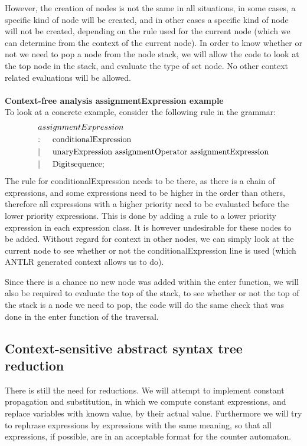 \documentclass[12pt]{article}
\begin{document}
However, the creation of nodes is not the same in all situations, in some cases, a specific kind of node will be created, and in other cases a specific kind of node will not be created, depending on the rule used for the current node (which we can determine from the context of the current node). In order to know whether or not we need to pop a node from the node stack, we will allow the code to look at the top node in the stack, and evaluate the type of set node. No other context related evaluations will be allowed.\\
\\
\noindent
\textbf{Context-free analysis assignmentExpression example}\\
To look at a concrete example, consider the following rule in the grammar:
\begin{align*}
	&assignmentExpression\\
	&\text{:}\indent \text{conditionalExpression}\\
	&|\indent \text{unaryExpression assignmentOperator assignmentExpression}\\
	&|\indent \text{Digitsequence}; \\
\end{align*}
The rule for conditionalExpression needs to be there, as there is a chain of expressions, and some expressions need to be higher in the order than others, therefore all expressions with a higher priority need to be evaluated before the lower priority expressions. This is done by adding a rule to a lower priority expression in each expression class. It is however undesirable for these nodes to be added. Without regard for context in other nodes, we can simply look at the current node to see whether or not the conditionalExpression line is used (which ANTLR generated context allows us to do).

Since there is a chance no new node was added within the enter function, we will also be required to evaluate the top of the stack, to see whether or not the top of the stack is a node we need to pop, the code will do the same check that was done in the enter function of the traversal.

\subsection{Context-sensitive abstract syntax tree reduction}
There is still the need for reductions. We will attempt to implement constant propagation and substitution, in which we compute constant expressions, and replace variables with known value, by their actual value. Furthermore we will try to rephrase expressions by expressions with the same meaning, so that all expressions, if possible, are in an acceptable format for the counter automaton.
\end{document}
